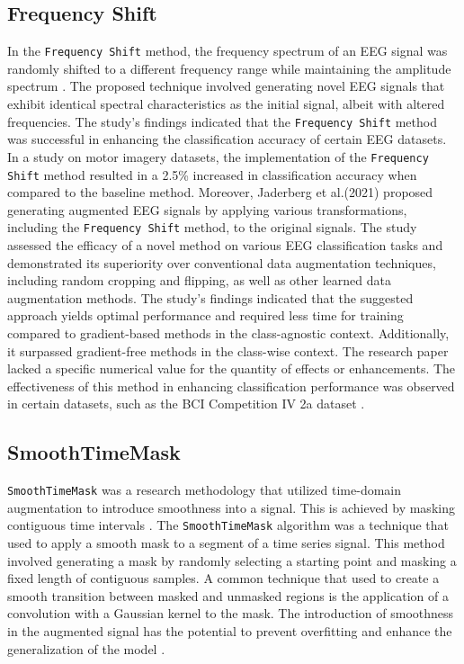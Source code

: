 \documentclass[runningheads]{llncs}
\begin{document}
\subsection{Frequency Shift}
In the \texttt{Frequency Shift} method, the frequency spectrum of an EEG signal was randomly shifted to a different frequency range while maintaining the amplitude spectrum \cite{rommel2022data}. The proposed technique involved generating novel EEG signals that exhibit identical spectral characteristics as the initial signal, albeit with altered frequencies.
 The study's findings indicated that the \texttt{Frequency Shift} method was successful in enhancing the classification accuracy of certain EEG datasets. In a study on motor imagery datasets, the implementation of the \texttt{Frequency Shift} method resulted in a 2.5\% increased in classification accuracy when compared to the baseline method. Moreover, Jaderberg et al.(2021) proposed generating augmented EEG signals by applying various transformations, including the \texttt{Frequency Shift} method, to the original signals. The study assessed the efficacy of a novel method on various EEG classification tasks and demonstrated its superiority over conventional data augmentation techniques, including random cropping and flipping, as well as other learned data augmentation methods. The study's findings indicated that the suggested approach yields optimal performance and required less time for training compared to gradient-based methods in the class-agnostic context. Additionally, it surpassed gradient-free methods in the class-wise context. The research paper lacked a specific numerical value for the quantity of effects or enhancements. The effectiveness of this method in enhancing classification performance was observed in certain datasets, such as the BCI Competition IV 2a dataset \cite{rommel2021cadda}.

\subsection{SmoothTimeMask}
\texttt{SmoothTimeMask} was a research methodology that utilized time-domain augmentation to introduce smoothness into a signal. This is achieved by masking contiguous time intervals \cite{mohsenvand2020contrastive}. The \texttt{SmoothTimeMask} algorithm was a technique that used to apply a smooth mask to a segment of a time series signal. This method involved generating a mask by randomly selecting a starting point and masking a fixed length of contiguous samples. A common technique that used to create a smooth transition between masked and unmasked regions is the application of a convolution with a Gaussian kernel to the mask. The introduction of smoothness in the augmented signal has the potential to prevent overfitting and enhance the generalization of the model \cite{mohsenvand2020contrastive}.
\end{document}
